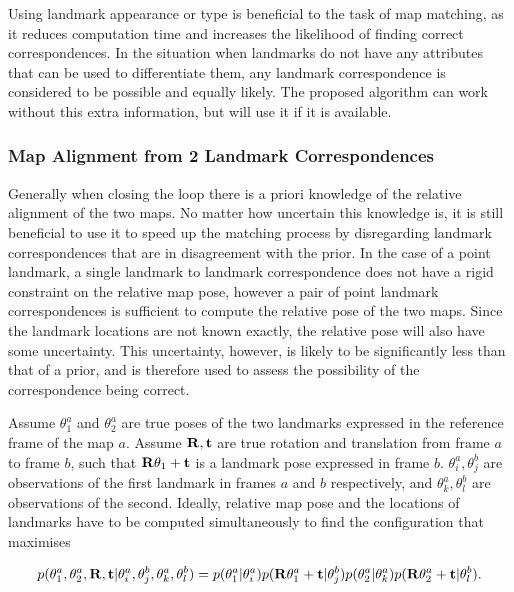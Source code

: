 Using landmark appearance or type is beneficial to the task of map
matching, as it reduces computation time and increases the likelihood
of finding correct correspondences. In the situation when landmarks do
not have any attributes that can be used to differentiate them, any
landmark correspondence is considered to be possible and equally
likely. The proposed algorithm can work without this extra
information, but will use it if it is available.


\subsubsection{Map Alignment from 2 Landmark Correspondences}

Generally when closing the loop there is a priori knowledge of the
relative alignment of the two maps. No matter how uncertain this
knowledge is, it is still beneficial to use it to speed up the
matching process by disregarding landmark correspondences that are in
disagreement with the prior. In the case of a point landmark, a single
landmark to landmark correspondence does not have a rigid constraint
on the relative map pose, however a pair of point landmark
correspondences is sufficient to compute the relative pose of the two
maps. Since the landmark locations are not known exactly, the relative
pose will also have some uncertainty. This uncertainty, however, is
likely to be significantly less than that of a prior, and is therefore
used to assess the possibility of the correspondence being
correct.

Assume $\theta^a_1$ and $\theta^a_2$ are true poses of the two
landmarks expressed in the reference frame of the map $a$. Assume
${\bf R,t}$ are true rotation and translation from frame $a$ to frame
$b$, such that ${\bf R}\theta_1 + \bf{t}$ is a landmark pose expressed
in frame $b$. $\theta^a_i, \theta^b_j$ are observations of the first
landmark in frames $a$ and $b$ respectively, and $\theta^a_k,
\theta^b_l$ are observations of the second. Ideally, relative map
pose and the locations of landmarks have to be computed
simultaneously to find the configuration that maximises

\begin{equation}
p(\theta^a_1, \theta^a_2, {\bf R},{\bf t}|
  \theta^a_i, \theta^b_j, \theta^a_k, \theta^b_l) =
p(\theta^a_1 | \theta^a_i)
p({\bf R}\theta^a_1+{\bf t} | \theta^b_j)
p(\theta^a_2 | \theta^a_k)
p({\bf R}\theta^a_2+{\bf t} | \theta^b_l).
\label{eqn:true_alignment_prob}
\end{equation}

